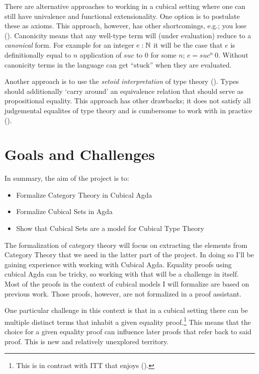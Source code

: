 \documentclass{article}
\newcommand{\sectiondescription}[1]{\iffalse #1\fi}
\begin{document}
There are alternative approaches to working in a cubical setting where one can
still have univalence and functional extensionality. One option is to postulate
these as axioms. This approach, however, has other shortcomings, e.g.; you lose
 (\cite{huber-2016}). Canonicity means that any well-type
term will (under evaluation) reduce to a \emph{canonical} form. For example for
an integer $e : \mathbb{N}$ it will be the case that $e$ is definitionally equal to $n$
application of $\mathit{suc}$ to $0$ for some $n$; $e = \mathit{suc}^n\ 0$.
Without canonicity terms in the language can get ``stuck'' when they are
evaluated.

Another approach is to use the \emph{setoid interpretation} of type theory
(\cite{hofmann-1995,huber-2016}). Types should additionally `carry around' an
equivalence relation that should serve as propositional equality. This approach
has other drawbacks; it does not satisfy all judgemental equalites of type
theory and is cumbersome to work with in practice (\cite[p. 4]{huber-2016}).
%
\section{Goals and Challenges}
%
\sectiondescription{%
Describe your contribution with respect to concepts, theory and technical goals.
Ensure that the scientific and engineering challenges stand out so that the
reader can easily recognize that you are planning to solve an advanced problem.
}
%
In summary, the aim of the project is to:
%
\begin{itemize}
\item
Formalize Category Theory in Cubical Agda
\item
Formalize Cubical Sets in Agda
\item
Show that Cubical Sets are a model for Cubical Type Theory
\end{itemize}
%
The formalization of category theory will focus on extracting the elements from
Category Theory that we need in the latter part of the project. In doing so I'll
be gaining experience with working with Cubical Agda. Equality proofs using
cubical Agda can be tricky, so working with that will be a challenge in itself.
Most of the proofs in the context of cubical models I will formalize are based
on previous work. Those proofs, however, are not formalized in a proof
assistant.

One particular challenge in this context is that in a cubical setting there can
be multiple distinct terms that inhabit a given equality proof.\footnote{This is
in contrast with ITT that enjoys 
(\cite[p. 4]{huber-2016}).} This means that the choice for a given equality
proof can influence later proofs that refer back to said proof. This is new and
relatively unexplored territory.
\end{document}
